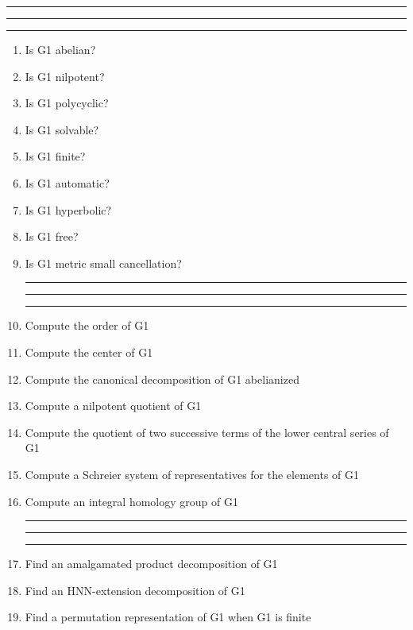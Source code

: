 
\bigskip
\hrule\hrule\hrule

\begin{enumerate}

\item Is G1 abelian?

\item Is G1 nilpotent?

\item Is G1 polycyclic?

\item Is G1 solvable?

\item Is G1 finite?

\item Is G1 automatic?

\item Is G1 hyperbolic?

\item Is G1 free?

\item Is G1 metric small cancellation?

\bigskip
\hrule\hrule\hrule

\item Compute the order of G1

\item Compute the center of G1

\item Compute the canonical decomposition of G1 abelianized

\item Compute a nilpotent quotient of G1

\item Compute the quotient of two successive terms of the lower central
series of G1

\item Compute a Schreier system of representatives for the elements of G1

\item Compute an integral homology group of G1

\bigskip
\hrule\hrule\hrule

\item Find an amalgamated product decomposition of G1

\item Find an HNN-extension decomposition of G1

\item Find a permutation representation of G1 when G1 is finite


\end{enumerate}
